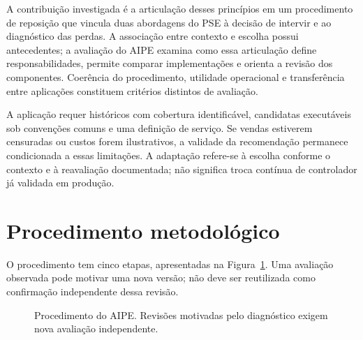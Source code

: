 A contribuição investigada é a articulação desses princípios em um procedimento de reposição que vincula duas abordagens do PSE à decisão de intervir e ao diagnóstico das perdas. A associação entre contexto e escolha possui antecedentes; a avaliação do AIPE examina como essa articulação define responsabilidades, permite comparar implementações e orienta a revisão dos componentes. Coerência do procedimento, utilidade operacional e transferência entre aplicações constituem critérios distintos de avaliação.

A aplicação requer históricos com cobertura identificável, candidatas executáveis sob convenções comuns e uma definição de serviço. Se vendas estiverem censuradas ou custos forem ilustrativos, a validade da recomendação permanece condicionada a essas limitações. A adaptação refere-se à escolha conforme o contexto e à reavaliação documentada; não significa troca contínua de controlador já validada em produção.

\section{Procedimento metodológico}
\label{sec:procedimento_aipe}
O procedimento tem cinco etapas, apresentadas na Figura~\ref{fig:aipe_procedimento}. Uma avaliação observada pode motivar uma nova versão; não deve ser reutilizada como confirmação independente dessa revisão.

\begin{figure}[htbp]\centering
{}
\caption{Procedimento do AIPE. Revisões motivadas pelo diagnóstico exigem nova avaliação independente.}\label{fig:aipe_procedimento}
\end{figure}

